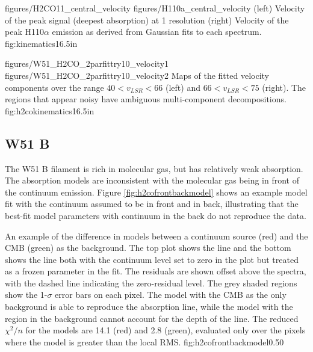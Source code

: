 \FigureTwoAA
{figures/H2CO11_central_velocity}
{figures/H110a_central_velocity}
{(left) Velocity of the peak \formaldehyde \oneone signal (deepest absorption) at
1 \kms resolution
(right) Velocity of the peak H110$\alpha$ emission as derived from Gaussian fits
to each spectrum.}
{fig:kinematics}{1}{6.5in}

\FigureTwoAA
{figures/W51_H2CO_2parfittry10_velocity1}
{figures/W51_H2CO_2parfittry10_velocity2}
{Maps of the fitted \formaldehyde velocity components over the range $40 <
v_{LSR} < 66$ \kms (left) and $66 < v_{LSR} < 75$ \kms (right).  The regions
that appear noisy have ambiguous multi-component decompositions.}
{fig:h2cokinematics}{1}{6.5in}

\subsection{W51 B}
\label{sec:w51b}
The W51 B filament is rich in molecular gas, but has relatively weak
\formaldehyde absorption.  The absorption models are inconsistent with
the molecular gas being in front of the continuum emission.
Figure \ref{fig:h2cofrontbackmodel} shows an example model fit with the
continuum assumed to be in front and in back, illustrating that the best-fit
model parameters with continuum in the back do not reproduce the data.

{An example of the difference in models between a continuum source (red) and
the CMB (green) as the background.  The top plot shows the \oneone line and the
bottom shows the \twotwo line both with the continuum level set to zero in the
plot but treated as a frozen parameter in the fit.  The residuals are shown
offset above the spectra, with the dashed line indicating the zero-residual
level.  The grey shaded regions show the 1-$\sigma$ error bars on each pixel.
The model with the CMB as the only
background is able to reproduce the absorption line, while the model with the
\hii region in the background cannot account for the depth of the \twotwo line.
The reduced $\chi^2/n$ for the models are 14.1 (red) and 2.8 (green), evaluated
only over the pixels where the model is greater than the local RMS.}
{fig:h2cofrontbackmodel}{0.5}{0}


